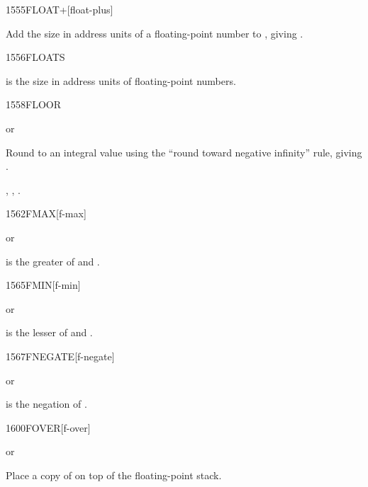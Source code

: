 \begin{worddef}{1555}{FLOAT+}[float-plus]
\item {}

	Add the size in address units of a floating-point number to
	, giving .
\end{worddef}


\begin{worddef}{1556}{FLOATS}
\item {}

	 is the size in address units of  floating-point
	numbers.
\end{worddef}


\begin{worddef}{1558}{FLOOR}
\item {} or

	Round  to an integral value using the ``round toward
	negative infinity'' rule, giving .

\see {}, ,
	.
\end{worddef}


\begin{worddef}{1562}{FMAX}[f-max]
\item {} or

	 is the greater of  and .
\end{worddef}


\begin{worddef}{1565}{FMIN}[f-min]
\item {} or

	 is the lesser of  and .
\end{worddef}


\begin{worddef}{1567}{FNEGATE}[f-negate]
\item {} or

	 is the negation of .
\end{worddef}


\begin{worddef}{1600}{FOVER}[f-over]
\item {} or

	Place a copy of  on top of the floating-point stack.
\end{worddef}


